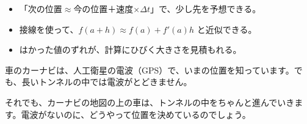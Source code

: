 \makeatletter
\newcommand\bkvhbox[7]{%
  \fill[#1!45, draw=bkInk, line width=0.45pt] (#2,#3,#4) -- (#5,#3,#4) -- (#5,#3,#7) -- (#2,#3,#7) -- cycle;
  \fill[#1!25, draw=bkInk, line width=0.45pt] (#5,#3,#4) -- (#5,#6,#4) -- (#5,#6,#7) -- (#5,#3,#7) -- cycle;
  \fill[#1!65, draw=bkInk, line width=0.45pt] (#2,#3,#7) -- (#5,#3,#7) -- (#5,#6,#7) -- (#2,#6,#7) -- cycle;}
\makeatother
{}

\begin{goal}
\begin{itemize}[label={\color{bkTheme}●}, leftmargin=1.6\zw, itemsep=0pt, topsep=1pt]
\item {}\enspace 「次の位置$\approx$今の位置＋速度×$\Delta t$」で、少し先を予想できる。
\item {}\enspace 接線を使って、$f(a+h)\approx f(a)+f'(a)h$ と近似できる。
\item {}\enspace はかった値のずれが、計算にひびく大きさを見積もれる。
\end{itemize}
\end{goal}

\begin{hatena}
\noindent\begin{minipage}[c]{0.55\linewidth}\raggedright
車のカーナビは、人工衛星の電波（GPS）で、いまの位置を知っています。でも、長いトンネルの中では電波がとどきません。

それでも、カーナビの地図の上の車は、トンネルの中をちゃんと進んでいきます。電波がないのに、どうやって位置を決めているのでしょう。
\end{minipage}\hfill
\begin{minipage}[c]{0.41\linewidth}
\end{minipage}
\end{hatena}


